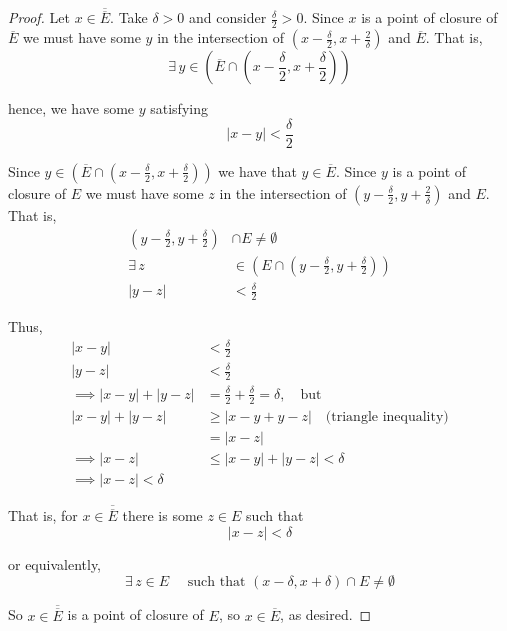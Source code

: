 \documentclass[12pt]{article}
\newlength\tindent
\renewcommand{\indent}{\hspace*{\tindent}}
\begin{document}
\begin{proof} Let $x \in \overline{\overline{E}}$. Take $\delta > 0$ and consider $\frac{\delta}{2} > 0$. Since $x$ is a point of closure of $\overline{E}$ we must have some $y$ in the intersection of $\left(x - \frac{\delta}{2}, x + \frac{2}{\delta}\right)$ and $\overline{E}$. That is,
\begin{equation*}
	\exists\,y\in \left( \overline{E} \cap \left(x - \frac{\delta}{2}, x + \frac{\delta}{2} \right) \right)
\end{equation*}

hence, we have some $y$ satisfying
\begin{equation*}
	|x - y| < \frac{\delta}{2}
\end{equation*}

\indent Since $y\in \left( \overline{E} \cap \left(x - \frac{\delta}{2}, x + \frac{\delta}{2} \right) \right)$ we have that $y \in \overline{E}$. Since $y$ is a point of closure of $E$ we must have some $z$ in the intersection of $\left(y - \frac{\delta}{2}, y + \frac{2}{\delta}\right)$ and $E$. That is,
\begin{align*}
	\left( y - \frac{\delta}{2}, y + \frac{\delta}{2} \right) &\cap E \neq \emptyset \\
	\exists\,z &\in \left( E \cap \left(y - \frac{\delta}{2}, y + \frac{\delta}{2}\right) \right) \\
	|y - z| &< \frac{\delta}{2}
\end{align*}

Thus,
\begin{align*}
	|x - y| &< \frac{\delta}{2} \\
	|y - z| &< \frac{\delta}{2} \\
	\implies |x - y| + |y - z| &= \frac{\delta}{2} + \frac{\delta}{2} = \delta, \quad \text{but} \\
	|x - y| + |y - z| &\geq |x - y + y - z| \quad \text{(triangle inequality)} \\
	&= |x - z| \\
	\implies |x - z| &\leq |x - y| + |y - z| < \delta \\
	\implies |x - z| < \delta
\end{align*}

That is, for $x \in \overline{\overline{E}}$ there is some $z \in E$ such that
\begin{equation*}
	|x - z| < \delta
\end{equation*}

or equivalently,
\begin{equation*}
	\exists\,z\in E \quad \text{ such that } (x - \delta, x + \delta) \cap E \neq \emptyset
\end{equation*}

So $x \in \overline{\overline{E}}$ is a point of closure of $E$, so $x \in \overline{E}$, as desired.

\end{proof}
\end{document}
